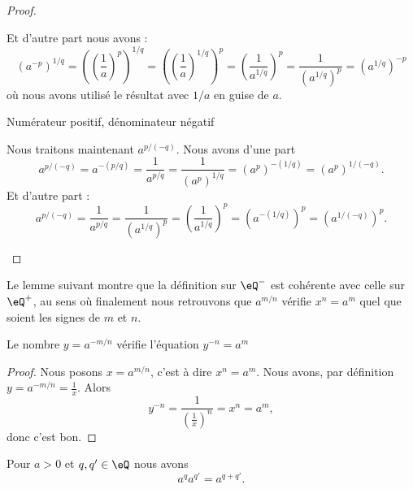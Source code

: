 \begin{proof}
\begin{subproof}
            Et d'autre part nous avons :
            \begin{equation}
                (a^{-p})^{1/q}=\left( \left( \frac{1}{ a } \right)^p \right)^{1/q}=\left( \left( \frac{1}{ a } \right)^{1/q} \right)^p=\left( \frac{1}{ a^{1/q} } \right)^p=\frac{1}{ (a^{1/q})^p }=(a^{1/q})^{-p}
            \end{equation}
            où nous avons utilisé le résultat avec \( 1/a\) en guise de \( a\).

        \item[Numérateur positif, dénominateur négatif]

            Nous traitons maintenant \( a^{p/(-q)}\). Nous avons d'une part
            \begin{equation}
                a^{p/(-q)}=a^{-(p/q)}=\frac{1}{ a^{p/q} }=\frac{1}{ (a^p)^{1/q} }=(a^p)^{-(1/q)}=(a^p)^{1/(-q)}.
            \end{equation}
            Et d'autre part :
            \begin{equation}
                a^{p/(-q)}=\frac{1}{ a^{p/q} }=\frac{1}{ (a^{1/q})^p }=\left( \frac{1}{ a^{1/q} } \right)^p=\left( a^{-(1/q)} \right)^p=(a^{1/(-q)})^p.
            \end{equation}
    \end{subproof}
\end{proof}

Le lemme suivant montre que la définition sur \( \eQ^-\) est cohérente avec celle sur \( \eQ^+\), au sens où finalement nous retrouvons que \( a^{m/n}\) vérifie \( x^n=a^m \) quel que soient les signes de \( m\) et \( n\).
\begin{lemma}
    Le nombre \( y=a^{-m/n}\) vérifie l'équation \( y^{-n}=a^m\)
\end{lemma}

\begin{proof}
    Nous posons \( x=a^{m/n}\), c'est à dire \( x^n=a^m\). Nous avons, par définition \( y=a^{-m/n}=\frac{1}{ x }\). Alors
    \begin{equation}
        y^{-n}=\frac{1}{ \left( \frac{1}{ x } \right)^n }=x^n=a^m,
    \end{equation}
    donc c'est bon.
\end{proof}

\begin{lemma}        \label{LEMooJYGUooHhLASp}
    Pour \( a>0\) et \( q,q'\in \eQ\) nous avons
    \begin{equation}
        a^qa^{q'}=a^{q+q'}.
    \end{equation}
\end{lemma}

